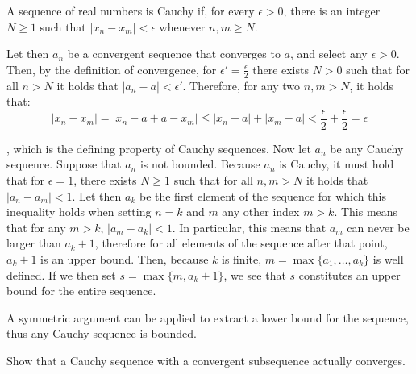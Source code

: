 \begin{solution}

    A sequence of real numbers is Cauchy if, for every $\epsilon > 0$, there is an integer $N \geq 1$ such that $\lvert x_n - x_m \rvert < \epsilon$ whenever $n, m \geq N$.

    Let then $a_n$ be a convergent sequence that converges to $a$, and select any $\epsilon > 0$. Then, by the definition of convergence, for $\epsilon' = \frac{\epsilon}{2}$ there exists $N > 0$ such that for all $n > N$ it holds that $\lvert a_n - a \rvert < \epsilon'$. Therefore, for any two $n, m > N$, it holds that:
    $$\lvert x_n - x_m \rvert = \lvert x_n - a + a - x_m \rvert \leq \lvert x_n -a \rvert + \lvert x_m -a \rvert < \frac{\epsilon}{2} + \frac{\epsilon}{2} = \epsilon$$

    , which is the defining property of Cauchy sequences. Now let $a_n$ be any Cauchy sequence. Suppose that $a_n$ is not bounded. Because $a_n$ is Cauchy, it must hold that for $\epsilon = 1$, there exists $N \geq 1$ such that for all $n, m > N$ it holds that $\lvert a_n - a_m \rvert < 1$. Let then $a_k$ be the first element of the sequence for which this inequality holds when setting $n=k$ and $m$ any other index $m > k$. This means that for any $m > k$, $\lvert a_m - a_k \rvert < 1$. In particular, this means that $a_m$ can never be larger than $a_k + 1$, therefore for all elements of the sequence after that point, $a_k+1$ is an upper bound. Then, because $k$ is finite, $m = \max\{a_1, \ldots, a_k\}$ is well defined. If we then set $s = \max\{m, a_k + 1\}$, we see that $s$ constitutes an upper bound for the entire sequence.

    A symmetric argument can be applied to extract a lower bound for the sequence, thus any Cauchy sequence is bounded.
\end{solution}

\begin{exercise}{15}
    Show that a Cauchy sequence with a convergent subsequence actually converges.
\end{exercise}

